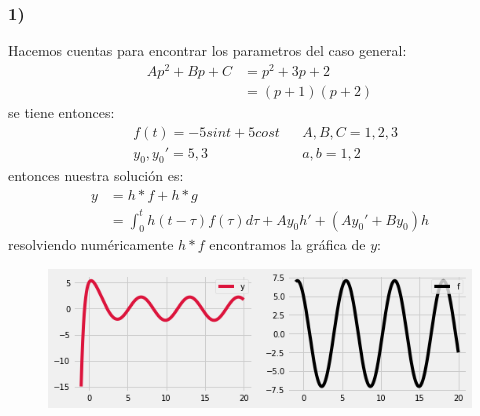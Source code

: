 \documentclass{article}
\begin{document}
\begin{tcolorbox}[breakable]
    \subsubsection*{1)}
    Hacemos cuentas para encontrar los parametros del caso general:
    \begin{align*}
        Ap^2 + Bp + C 
        &= p^2 + 3p + 2 \\
        &= (p+1)(p+2) 
    \end{align*}
    se tiene entonces:
    \begin{align*}
        &f(t) = -5sint + 5cost
        &&A, B, C = 1, 2, 3 \\ 
        &y_0, y_0' = 5, 3 
        &&a, b = 1, 2 
    \end{align*}
    entonces nuestra solución es:
    \begin{align*}
        y 
        &= h*f + h*g \\
        &= \int_{0}^t h(t-\tau)f(\tau)d\tau  + Ay_0h' + (Ay_0'+By_0)h 
    \end{align*}
    resolviendo numéricamente $h*f$ encontramos la gráfica de $y$:
    \begin{figure}[H]
        \centering
        \includegraphics[scale=0.7]{images/p1_1.png}
    \end{figure}


\end{tcolorbox}
\end{document}
